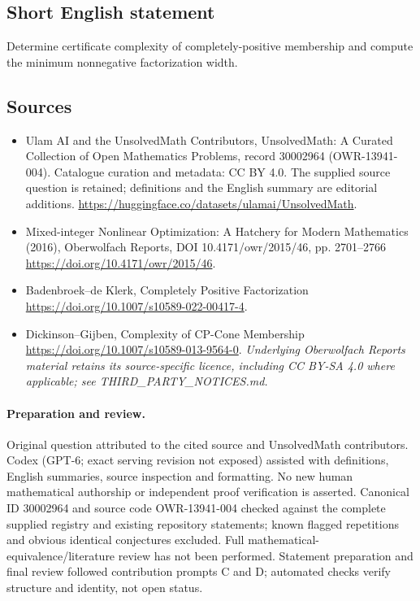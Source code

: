 \documentclass[11pt]{article}
\begin{document}
\subsection{Short English statement}
Determine certificate complexity of completely-positive membership and compute the minimum nonnegative factorization width.
\subsection{Sources}
\begin{itemize}
\item[\hypertarget{source:30002964:1}{S1}] Ulam AI and the UnsolvedMath Contributors, UnsolvedMath: A Curated Collection of Open Mathematics Problems, record 30002964 (OWR-13941-004). Catalogue curation and metadata: CC BY 4.0. The supplied source question is retained; definitions and the English summary are editorial additions.
\url{https://huggingface.co/datasets/ulamai/UnsolvedMath}.
\item[\hypertarget{source:30002964:2}{S2}] Mixed-integer Nonlinear Optimization: A Hatchery for Modern Mathematics (2016), Oberwolfach Reports, DOI 10.4171/owr/2015/46, pp. 2701--2766
\url{https://doi.org/10.4171/owr/2015/46}.
\item[\hypertarget{source:30002964:3}{S3}] Badenbroek--de Klerk, Completely Positive Factorization
\url{https://doi.org/10.1007/s10589-022-00417-4}.
\item[\hypertarget{source:30002964:4}{S4}] Dickinson--Gijben, Complexity of CP-Cone Membership
\url{https://doi.org/10.1007/s10589-013-9564-0}.
\textit{Underlying Oberwolfach Reports material retains its source-specific licence, including CC BY-SA 4.0 where applicable; see THIRD\_PARTY\_NOTICES.md.}
\end{itemize}
\paragraph{Preparation and review.}
Original question attributed to the cited source and UnsolvedMath contributors. Codex (GPT-6; exact serving revision not exposed) assisted with definitions, English summaries, source inspection and formatting. No new human mathematical authorship or independent proof verification is asserted. Canonical ID 30002964 and source code OWR-13941-004 checked against the complete supplied registry and existing repository statements; known flagged repetitions and obvious identical conjectures excluded. Full mathematical-equivalence/literature review has not been performed. Statement preparation and final review followed contribution prompts C and D; automated checks verify structure and identity, not open status.
\label{end:30002964}
\end{document}
